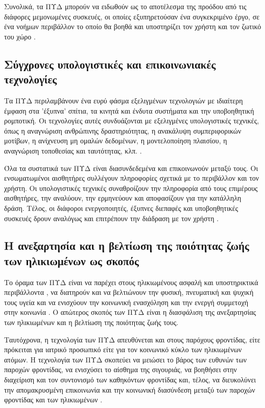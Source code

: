 Συνολικά, τα ΠΥΔ μπορούν να ειδωθούν ως το αποτέλεσμα της προόδου από τις διάφορες μεμονωμένες συσκευές, οι οποίες εξυπηρετούσαν ένα συγκεκριμένο έργο, σε ένα νοήμων περιβάλλον το οποίο θα βοηθά και υποστηρίζει τον χρήστη και τον ζωτικό του χώρο \cite{Blackman2016}.

\subsection{Σύγχρονες υπολογιστικές και επικοινωνιακές τεχνολογίες}
Τα ΠΥΔ περιλαμβάνουν ένα ευρύ φάσμα εξελιγμένων τεχνολογιών με ιδιαίτερη έμφαση στα 'έξυπνα' σπίτια, τα κινητά και ένδυτα συστήματα και την υποβοηθητική ρομποτική.\cite{rashidi2012survey}
Οι τεχνολογίες αυτές συνδυάζονται με εξελιγμένες υπολογιστικές τεχνικές, όπως η αναγνώριση ανθρώπινης δραστηριότητας, η ανακάλυψη συμπεριφορικών μοτίβων, η ανίχνευση μη ομαλών δεδομένων, η μοντελοποίηση πλαισίου, η αναγνώριση τοποθεσίας και ταυτότητας, κλπ. \cite{rashidi2012survey} \cite{Acampora2013}.
\par
Όλα τα συστατικά των ΠΥΔ είναι διασυνδεδεμένα και επικοινωνούν μεταξύ τους.
Οι ενσωματωμένοι αισθητήρες συλλέγουν πληροφορίες σχετικά με το περιβάλλον και τον χρήστη.
Οι υπολογιστικές τεχνικές συναθροίζουν την πληροφορία από τους επιμέρους αισθητήρες, την αναλύουν, την ερμηνεύουν και αποφασίζουν για την κατάλληλη δράση.
Τέλος, οι διάφοροι ενεργοποιητές, έξυπνες διεπαφές και υποβοηθητικές συσκευές δρουν αναλόγως και επιτρέπουν την διάδραση με τον χρήστη \cite{broek}.
\subsection{Η ανεξαρτησία και η βελτίωση της ποιότητας ζωής των ηλικιωμένων ως σκοπός}
Το όραμα των ΠΥΔ είναι να παρέχει στους ηλικιωμένους ασφαλή και υποστηρικτικά περιβάλλοντα , να διατηρούν και να βελτιώνουν την φυσική, πνευματική και ψυχική τους υγεία και να ενισχύουν την κοινωνική ενασχόληση και την ενεργή συμμετοχή στην κοινωνία \cite{Queiros2013}\cite{Blackman2016}\cite{broek}\cite{Peek2014}\cite{cardinaux}.
Ο απώτερος σκοπός των ΠΥΔ είναι η διασφάλιση της ανεξαρτησίας των ηλικιωμένων και η βελτίωση της ποιότητας ζωής τους.
\par
Ταυτόχρονα, η τεχνολογία των ΠΥΔ απευθύνεται και στους παρόχους φροντίδας, είτε πρόκειται για ιατρικό προσωπικό είτε για τον κοινωνικό κύκλο των ηλικιωμένων ατόμων.
Η τεχνολογία των ΠΥΔ σκοπεύει να μειώσει το βάρος των ευθυνών των παροχών φροντίδας, να ενισχύσει το αίσθημα της σιγουριάς, να βοηθήσει στην διαχείριση και τον συντονισμό των καθηκόντων φροντίδας και, τέλος, να διευκολύνει την απομακρυσμένη επικοινωνία και την κοινωνική διασύνδεση μεταξύ των παροχών φροντίδας και των ηλικιωμένων \cite{rashidi2012survey}\cite{Bossen2013}\cite{Cornejo2012}.
